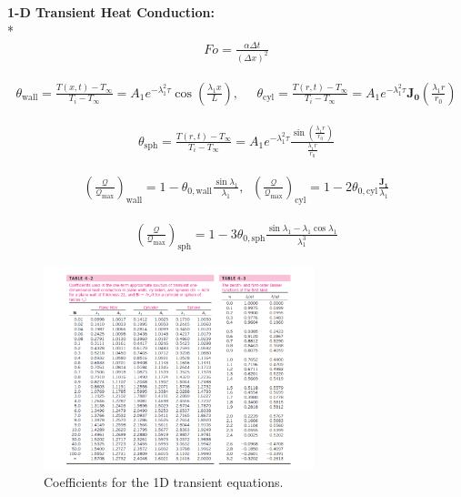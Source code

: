 \begin{datasheet}
{\bf 1-D Transient Heat Conduction:}\\*
\begin{align*}
   Fo = \frac{\alpha \Delta t}{\left(\Delta x\right)^{2}}
\end{align*}


\begin{align*}
   \theta_{\text{wall}} = \frac{T(x,t)-T_{\infty}}{T_{i}-T_{\infty}}= A_{1}e^{-\lambda_{1}^{2}\tau}\cos{\left(\frac{\lambda_{1}x}{L}\right)},\;\;\;\;\; \theta_{\text{cyl}} = \frac{T(r,t)-T_{\infty}}{T_{i}-T_{\infty}}= A_{1}e^{-\lambda_{1}^{2}\tau}\mathbf{J_{0}}\left(\frac{\lambda_{1}r}{r_{0}}\right)
\end{align*}

\begin{align*}
   \theta_{\text{sph}} = \frac{T(r,t)-T_{\infty}}{T_{i}-T_{\infty}}= A_{1}e^{-\lambda_{1}^{2}\tau}\frac{\sin{\left(\frac{\lambda_{1}r}{r_{0}}\right)}}{\frac{\lambda_{1}r}{r_{0}}}
\end{align*}


\begin{align*}
   \left(\frac{\mathcal{Q}}{\mathcal{Q}_{\text{max}}}\right)_{\text{wall}} = 1 - \theta_{0,\text{wall}}\frac{\sin{\lambda_{1}}}{\lambda_{1}},\;\;\left(\frac{\mathcal{Q}}{\mathcal{Q}_{\text{max}}}\right)_{\text{cyl}} = 1- 2\theta_{0,\text{cyl}}\frac{\mathbf{J_{1}}}{\lambda_{1}}
\end{align*}

\begin{align*}
    \left(\frac{\mathcal{Q}}{\mathcal{Q}_{\text{max}}}\right)_{\text{sph}} = 1 - 3\theta_{0,\text{sph}}\frac{\sin{\lambda_{1}}-\lambda_{1}\cos{\lambda_{1}}}{\lambda_{1}^{3}}
\end{align*}

\begin{figure}[h!]%
  \begin{center}%
    \includegraphics[width=0.7\textwidth,clip]{figures/BaselFunctionTable}
  \end{center}
  \caption{Coefficients for the 1D transient equations.}
\end{figure}



\end{datasheet}
